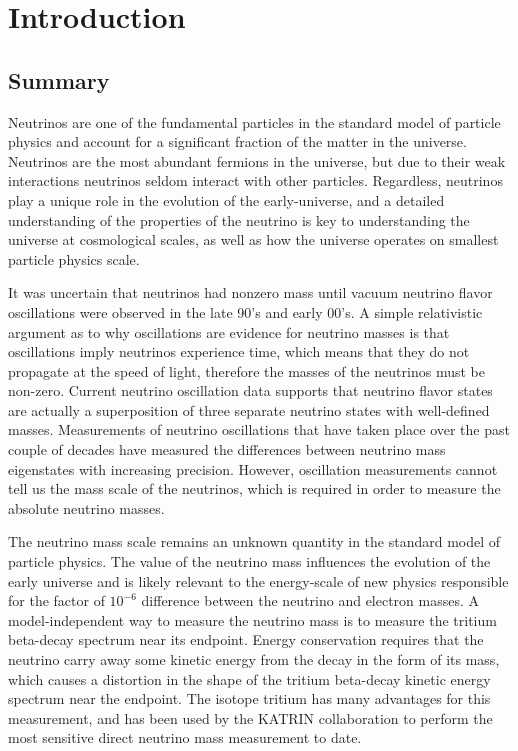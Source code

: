 
\chapter{Introduction} 
\label{chap:introduction}

\section{Summary}

Neutrinos are one of the fundamental particles in the standard model of particle physics and account for a significant fraction of the matter in the universe. Neutrinos are the most abundant fermions in the universe, but due to their weak interactions neutrinos seldom interact with other particles. Regardless, neutrinos play a unique role in the evolution of the early-universe, and a detailed understanding of the properties of the neutrino is key to understanding the universe at cosmological scales, as well as how the universe operates on smallest particle physics scale.

It was uncertain that neutrinos had nonzero mass until vacuum neutrino flavor oscillations were observed in the late 90's and early 00's. A simple relativistic argument as to why oscillations are evidence for neutrino masses is that oscillations imply neutrinos experience time, which means that they do not propagate at the speed of light, therefore the masses of the neutrinos must be non-zero. Current neutrino oscillation data supports that neutrino flavor states are actually a superposition of three separate neutrino states with well-defined masses. Measurements of neutrino oscillations that have taken place over the past couple of decades have measured the differences between neutrino mass eigenstates with increasing precision. However, oscillation measurements cannot tell us the mass scale of the neutrinos, which is required in order to measure the absolute neutrino masses.

The neutrino mass scale remains an unknown quantity in the standard model of particle physics. The value of the neutrino mass influences the evolution of the early universe and is likely relevant to the energy-scale of new physics responsible for the factor of $10^{-6}$ difference between the neutrino and electron masses. A model-independent way to measure the neutrino mass is to measure the tritium beta-decay spectrum near its endpoint. Energy conservation requires that the neutrino carry away some kinetic energy from the decay in the form of its mass, which causes a distortion in the shape of the tritium beta-decay kinetic energy spectrum near the endpoint. The isotope tritium has many advantages for this measurement, and has been used by the KATRIN collaboration to perform the most sensitive direct neutrino mass measurement to date.

